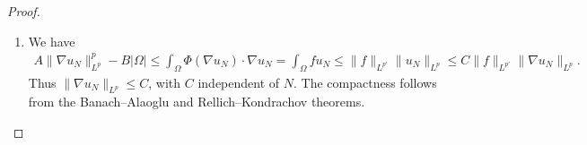\begin{proof}
\begin{enumerate}
\begin{enumerate}
                        Similarly,
                        $$
                            \begin{aligned}
                                F(\alpha) \cdot \alpha & = \int_\Omega \Phi\left(  \nabla u_\alpha   \right) \cdot \nabla u_\alpha - \int_\Omega f u_\alpha \\
                                                       & \ge A \| \nabla u_\alpha \|_{L^p}^p - B |\Omega| - \| f \|_{L^{p'}} \|u_\alpha\|_{L^p}                 \\
                                                       & \ge A C_P^p \| u_\alpha \|_{L^p}^p - B |\Omega| - C\| u_\alpha \|_{L^p},
                            \end{aligned}
                        $$
                        where $C_P$ is the constant in Poincaré's inequality $\|\nabla v\|_{L^p} \ge C_P \|v\|_{L^p}$ for $v \in W^{1,p}_0(\Omega)$.
                        Since all norms in $\R^N$ are equivalent, $\| u_\alpha \|_{L^p} \sim |\alpha|$. Since $p > 1$, the term of order $|\alpha|^p$ dominates and has a positive constant.


                  \item
                        For $R > 0$ sufficiently large, $F(\alpha) \cdot \alpha \ge 0$ if $|\alpha| = R$.

                        If $F$ does not vanish in $\overline B(0,R)$,  $G: \overline B(0,R) \to \overline B(0,R)$ is well defined and continuous. It has a fixed point $\alpha_0$ by Brouwer's fixed point theorem. At such a fixed point, $|\alpha_0| = |G(\alpha_0)| = R$. But, on the other hand,
                        $$
                            R^2 = |\alpha_0|^2 = G(\alpha_0) \cdot \alpha_0 = -R \frac{F(\alpha_0) \cdot \alpha_0}{|F(\alpha_0)|} \le 0,
                        $$
                        a contradiction.

              \end{enumerate}


        \item We have
              $$
                  \begin{aligned}
                      A \| \nabla u_N\|_{L^p}^p  - B |\Omega| \le \int_\Omega \Phi(\nabla u_N) \cdot \nabla u_N = \int_\Omega f u_N \le \| f \|_{L^{p'}} \| u_N \|_{L^p} \le C \| f \|_{L^{p'}} \| \nabla u_N \|_{L^p}.
                  \end{aligned}
              $$
              Thus $\| \nabla u_N \|_{L^p} \le C$, with $C$ independent of $N$. The compactness follows from the Banach--Alaoglu and Rellich--Kondrachov theorems.


\end{enumerate}
\end{proof}
